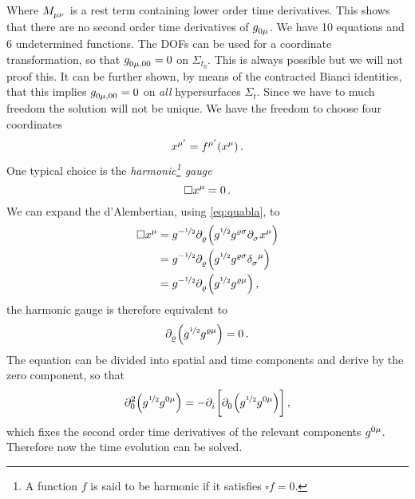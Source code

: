Where $\tensor{M}{_\mu_\nu}$ is a rest term containing lower order
time derivatives.
This shows that there are no second order time derivatives of
$\tensor{g}{_0_\mu}$. We have 10 equations and 6 undetermined functions. The
DOFs can be used for a coordinate transformation, so that
$\tensor{g}{_0_\mu_{,00}}=0$ on $\Sigma_{t_0}$. This is always possible but we
will not proof this. It can be further shown, by means of the contracted Bianci
identities, that this implies $\tensor{g}{_0_\mu_{,00}}=0$ on \emph{all}
hypersurfaces $\Sigma_{t}$.
Since we have to much freedom the solution will not be unique. We have the
freedom to choose four coordinates
\begin{equation}
\tensor{x}{^{\mu^\prime}}=\tensor{f}{^{\mu^\prime}}\left(\tensor{x}{^\mu}\right)\,.
\end{equation}
One typical choice is the \emph{harmonic\footnote{A function $f$ is said to be
harmonic if it satisfies $\square f = 0$.} gauge}
\begin{equation}
\square\tensor{x}{^\mu}=0\,.
\end{equation}
We can expand the d'Alembertian, using \eqref{eq:quabla}, to
\begin{equation}
\begin{split}
\square\tensor{x}{^\mu}&=g^{-\nicefrac{1}{2}}\tensor{\partial}{_\varrho}\left(g^{\nicefrac{1}{2}}\tensor{g}{^\varrho^\sigma}\tensor{\partial}{_\sigma}\tensor{x}{^\mu}\right)\\
&=g^{-\nicefrac{1}{2}}\tensor{\partial}{_\varrho}\left(g^{\nicefrac{1}{2}}\tensor{g}{^\varrho^\sigma}\tensor{\delta}{_\sigma^\mu}\right)\\
&=g^{-\nicefrac{1}{2}}\tensor{\partial}{_\varrho}\left(g^{\nicefrac{1}{2}}\tensor{g}{^\varrho^\mu}\right)\,,\\
\end{split}
\end{equation}
the harmonic gauge is therefore equivalent to
\begin{equation}
\tensor{\partial}{_\varrho}\left(g^{\nicefrac{1}{2}}\tensor{g}{^\varrho^\mu}\right)=0\,
.\\
\end{equation}
The equation can be divided into spatial and time components and derive by the
zero component, so that
\begin{equation}
\tensor*{\partial}{*_0^2}\left(g^{\nicefrac{1}{2}}\tensor{g}{^0^\mu}\right)
=
-\tensor{\partial}{_i}\left[\tensor{\partial}{_0}\left(g^{\nicefrac{1}{2}}\tensor{g}{^0^\mu}\right)\right]\,
,\end{equation}
which fixes the second order time derivatives of the relevant components
$\tensor{g}{^0^\mu}$. Therefore now the time evolution can be solved. 

